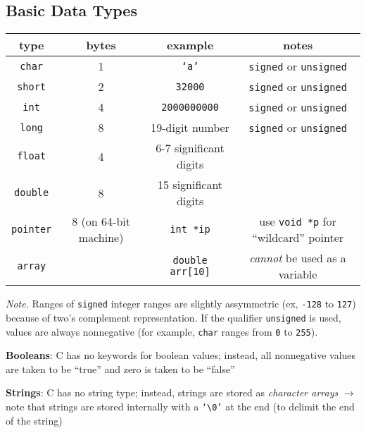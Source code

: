 \documentclass{article}
\theoremstyle{definition} %
\newcommand{\nline}{\vspace{\baselineskip}}
\begin{document}
\begin{flushleft}

\section{Basic Data Types}

\begin{center}

\begin{tabular}{|c|c|c|c|}
    \hline
    type & bytes & example & notes \\
    \hline
    \texttt{char} & 1 & \texttt{`a'} & \texttt{signed} or \texttt{unsigned} \\
    \hline
    \texttt{short} & 2 & \texttt{32000} & \texttt{signed} or \texttt{unsigned} \\
    \hline
    \texttt{int} & 4 & \texttt{2000000000} & \texttt{signed} or \texttt{unsigned} \\
    \hline
    \texttt{long} & 8 & 19-digit number & \texttt{signed} or \texttt{unsigned} \\
    \hline
    \texttt{float} & 4 & 6-7 significant digits & \\
    \hline
    \texttt{double} & 8 & 15 significant digits & \\
    \hline
    \texttt{pointer} & 8 (on 64-bit machine) & \texttt{int *ip} & use \texttt{void *p} for ``wildcard'' pointer \\
    \hline
    \texttt{array} &  & \texttt{double arr[10]} & \textit{cannot} be used as a variable \\
    \hline
\end{tabular}

\end{center}

\textit{Note.} Ranges of \texttt{signed} integer ranges are slightly assymmetric (ex, \texttt{-128} to \texttt{127}) because of two's complement representation. If the qualifier \texttt{unsigned} is used, values are always nonnegative (for example, \texttt{char} ranges from \texttt{0} to \texttt{255}).

\nline

\textbf{Booleans}: C has no keywords for boolean values; instead, all nonnegative values are taken to be ``true'' and zero is taken to be ``false''

\nline

\textbf{Strings}: C has no string type; instead, strings are stored as \textit{character arrays} $\to$ note that strings are stored internally with a \texttt{`\textbackslash 0'} at the end (to delimit the end of the string)


\end{flushleft}
\end{document}
